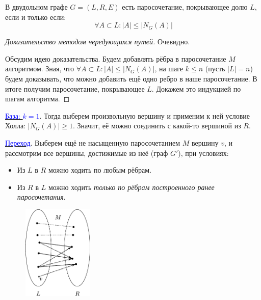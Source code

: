 \begin{frame}[t]
    \begin{theorem}[P.Hall, 1935]
        В двудольном графе $G = \left( L, R, E \right) $ есть паросочетание, покрывающее долю $L$, если и только если:  $$\forall A \subset L: |A| \leq |N_G(A)|$$
    \end{theorem}
    
    \begin{proof}[Доказательство методом чередующихся путей]
        \renewcommand{\qedsymbol}{}
        \fbox{$ \Rightarrow $} Очевидно.
        
        \fbox{$ \Leftarrow $} Обсудим идею доказательства. Будем добавлять рёбра в паросочетание $M$ алгоритмом. Зная, что $\forall A \subset L: |A| \leq |N_G(A)|$, на шаге $k \leq n$ (пусть $|L| = n$) будем доказывать, что можно добавить ещё одно ребро в наше паросочетание. В итоге получим паросочетание, покрывающее $L$. Докажем это индукцией по шагам алгоритма.
    \end{proof}
\end{frame}

\begin{frame}[t]
    \small
    \underline{\textcolor{blue}{База: $k = 1$}}. Тогда выберем произвольную вершину и применим к ней условие Холла:  $|N_G (A)| \geq 1$. Значит, её можно соединить с какой-то вершиной из $R$.
    
    \underline{\textcolor{blue}{Переход}}. Выберем ещё не насыщенную паросочетанием $M$ вершину $v$, и рассмотрим все вершины, достижимые из неё (граф $G'$), при условиях:
     \begin{itemize}
        \item Из $L$ в $R$ можно ходить по любым рёбрам.
        \item Из $R$ в $L$ можно ходить \textit{только по рёбрам построенного ранее паросочетания}.
    \end{itemize}

    \begin{figure}[h]
        \centering
        \includegraphics[width=0.3\textwidth]{images/condition}
    \end{figure}
    
\end{frame}

